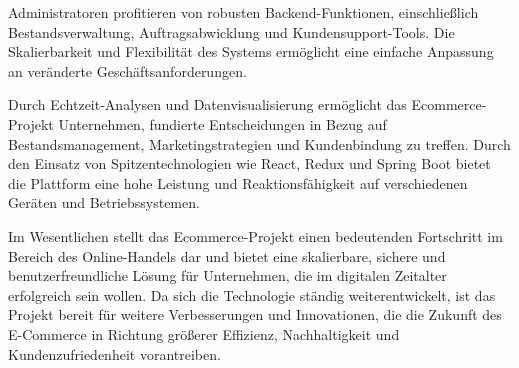 	Administratoren profitieren von robusten Backend-Funktionen, einschließlich Bestandsverwaltung, Auftragsabwicklung und Kundensupport-Tools. Die Skalierbarkeit und Flexibilität des Systems ermöglicht eine einfache Anpassung an veränderte Geschäftsanforderungen.
	
	Durch Echtzeit-Analysen und Datenvisualisierung ermöglicht das Ecommerce-Projekt Unternehmen, fundierte Entscheidungen in Bezug auf Bestandsmanagement, Marketingstrategien und Kundenbindung zu treffen. Durch den Einsatz von Spitzentechnologien wie React, Redux und Spring Boot bietet die Plattform eine hohe Leistung und Reaktionsfähigkeit auf verschiedenen Geräten und Betriebssystemen.
	
	Im Wesentlichen stellt das Ecommerce-Projekt einen bedeutenden Fortschritt im Bereich des Online-Handels dar und bietet eine skalierbare, sichere und benutzerfreundliche Lösung für Unternehmen, die im digitalen Zeitalter erfolgreich sein wollen. Da sich die Technologie ständig weiterentwickelt, ist das Projekt bereit für weitere Verbesserungen und Innovationen, die die Zukunft des E-Commerce in Richtung größerer Effizienz, Nachhaltigkeit und Kundenzufriedenheit vorantreiben.

	\backmatter                     %
	
	
	
	


